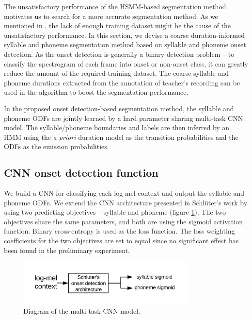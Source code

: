 The unsatisfactory performance of the \gls{HSMM}-based segmentation method motivates us to search for a more accurate segmentation method. As we mentioned in , the lack of enough training dataset might be the cause of the unsatisfactory performance. In this section, we devise a coarse duration-informed syllable and phoneme segmentation method based on syllable and phoneme onset detection. As the onset detection is generally a binary detection problem -- to classify the spectrogram of each frame into onset or non-onset class, it can greatly reduce the amount of the required training dataset. The coarse syllable and phoneme durations extracted from the annotation of teacher's recording can be used in the algorithm to boost the segmentation performance.

In the proposed onset detection-based segmentation method, the syllable and phoneme \gls{ODF}s are jointly learned by a hard parameter sharing multi-task \gls{CNN} model. The syllable/phoneme boundaries and labels are then inferred by an \gls{HMM} using the \textit{a priori} duration model as the transition probabilities and the \gls{ODF}s as the emission probabilities.

\subsection{CNN onset detection function}\label{sec:ch5:cnn_odf}

We build a \gls{CNN} for classifying each log-mel context and output the syllable and phoneme \gls{ODF}s. We extend the \gls{CNN} architecture presented in Schl\"{u}ter's work \cite{Schluter2014} by using two predicting objectives -- syllable and phoneme (figure \ref{fig:cnn_architecture}). The two objectives share the same parameters, and both are using the sigmoid activation function. Binary cross-entropy is used as the loss function. The loss weighting coefficients for the two objectives are set to equal since no significant effect has been found in the preliminary experiment.

\begin{figure}[ht!]
    \centering
    \includegraphics[width=0.8\textwidth]{figs/blockDiags_rong/ch5_cnn_architecture_segmentation.png}
    \caption{Diagram of the multi-task CNN model.}
    \label{fig:cnn_architecture}
\end{figure}

